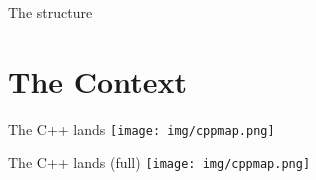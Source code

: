 \documentclass[11pt]{beamer}
\begin{document}

\begin{frame}{The structure}
\tableofcontents
\end{frame}


\section{The Context}

\begin{frame}{The C++ lands}
\pause
\texttt{[image: img/cppmap.png]}
\end{frame}

\begin{frame}{The C++ lands (full)}
\texttt{[image: img/cppmap.png]}
\end{frame}




\end{document}

